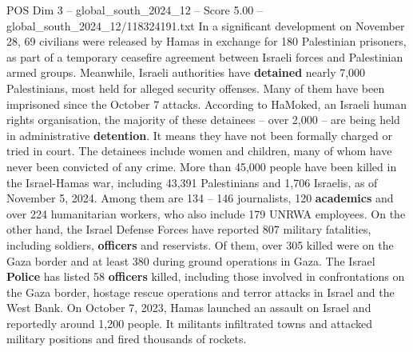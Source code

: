 \begin{textsample}{POS Dim 3 – global\_south\_2024\_12 – Score 5.00 – global\_south\_2024\_12/118324191.txt}
In a significant development on November 28, 69 civilians were released by Hamas in exchange for 180 Palestinian prisoners, as part of a temporary ceasefire agreement between Israeli forces and Palestinian armed groups.
Meanwhile, Israeli authorities have \textbf{detained} nearly 7,000 Palestinians, most held for alleged security offenses.
Many of them have been imprisoned since the October 7 attacks.
According to HaMoked, an Israeli human rights organisation, the majority of these detainees -- over 2,000 -- are being held in administrative \textbf{detention}.
It means they have not been formally charged or tried in court.
The detainees include women and children, many of whom have never been convicted of any crime.
More than 45,000 people have been killed in the Israel-Hamas war, including 43,391 Palestinians and 1,706 Israelis, as of November 5, 2024.
Among them are 134 -- 146 journalists, 120 \textbf{academics} and over 224 humanitarian workers, who also include 179 UNRWA employees.
On the other hand, the Israel Defense Forces have reported 807 military fatalities, including soldiers, \textbf{officers} and reservists.
Of them, over 305 killed were on the Gaza border and at least 380 during ground operations in Gaza.
The Israel \textbf{Police} has listed 58 \textbf{officers} killed, including those involved in confrontations on the Gaza border, hostage rescue operations and terror attacks in Israel and the West Bank.
On October 7, 2023, Hamas launched an assault on Israel and reportedly around 1,200 people.
It militants infiltrated towns and attacked military positions and fired thousands of rockets.

\end{textsample}
